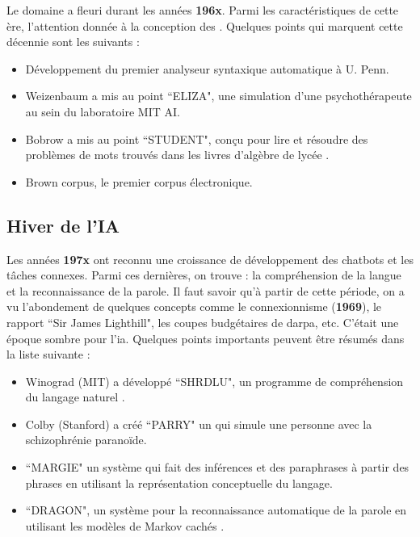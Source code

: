 \documentclass{KodeBook}
\begin{document}
Le domaine a fleuri durant les années \textbf{196x}.
Parmi les caractéristiques de cette ère, l'attention donnée à la conception des . 
Quelques points qui marquent cette décennie sont les suivants :
\begin{itemize}
	\item {} Développement du premier analyseur syntaxique automatique à U. Penn. \cite{1961-joshi,1962-harris} 
	\item {} Weizenbaum a mis au point ``ELIZA", une simulation d'une psychothérapeute au sein du laboratoire MIT AI.
	\item {} Bobrow a mis au point ``STUDENT", conçu pour lire et résoudre des problèmes de mots trouvés dans les livres d'algèbre de lycée \cite{1964-bobrow}.
	\item {} Brown corpus, le premier corpus électronique.
\end{itemize}

\subsection{Hiver de l'IA}

Les années \textbf{197x} ont reconnu une croissance de développement des chatbots et les tâches connexes. 
Parmi ces dernières, on trouve : la compréhension de la langue et la reconnaissance  de la parole. 
Il faut savoir qu'à partir de cette période, on a vu l'abondement de quelques concepts comme le connexionnisme (\textbf{1969}), le rapport ``Sir James Lighthill", les coupes budgétaires de \ac{darpa}, etc. 
C'était une époque sombre pour l'\ac{ia}.
Quelques points importants peuvent être résumés dans la liste suivante :
\begin{itemize}
	\item {} Winograd (MIT) a développé ``SHRDLU", un programme de compréhension du langage naturel \cite{1971-winograd}.
	\item {} Colby (Stanford) a créé ``PARRY" un  qui simule une personne avec la schizophrénie paranoïde.
	\item {} ``MARGIE" un système qui fait des inférences et des paraphrases à partir des phrases en utilisant la représentation conceptuelle du langage. 
	\item {} ``DRAGON", un système pour la reconnaissance automatique de la parole en utilisant les modèles de Markov cachés \cite{1975-baker}.
\end{itemize}
\end{document}
